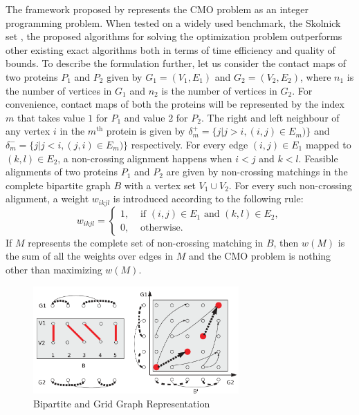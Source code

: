 The framework proposed by \citet{anmy11} represents the CMO problem as an integer programming problem.
When tested on a widely used benchmark, the Skolnick set \citep{gosk94}, the proposed algorithms for solving the optimization problem outperforms other existing exact algorithms both in terms of time efficiency and quality of bounds. To describe the formulation further, let us consider the contact maps of two proteins $P_1$ and $P_2$ given by $G_1 = (V_1,E_1)$ and $G_2 = (V_2,E_2)$, where $n_1$ is the number of vertices in $G_1$ and $n_2$ is the number of vertices in $G_2$. For convenience, contact maps of both the proteins will be represented by the index $m$ that takes value $1$ for $P_1$ and value $2$ for $P_2$. The right and left neighbour of any vertex $i$ in the $m^{\text{th}}$ protein is given by $\delta_m^+ = \{j | j>i ,(i,j) \in E_m)\}$ and  $\delta_m^- = \{j | j<i ,(j,i) \in E_m)\}$ respectively. For every edge $(i,j)\in E_1$ mapped to  $(k,l)\in E_2$, a non-crossing alignment happens when $i<j$ and $k<l$. Feasible alignments of two proteins $P_1$ and $P_2$ are given by non-crossing matchings in the complete bipartite graph $B$ with a vertex set $V_1\cup V_2$.
For every such non-crossing alignment, a weight $w_{ikjl}$ is introduced according to the following rule:
\begin{equation}
\label{rec11}
w_{ikjl}=\begin{cases}
    1, & \text{ if } (i,j) \in E_1 \text{ and } (k,l) \in E_2,\\
    0, & \text{ otherwise}.
  \end{cases}
\end{equation}
If $M$ represents the complete set of non-crossing matching in $B$, then $w(M)$ is the sum of all the weights over edges in $M$ and the CMO problem is nothing other than maximizing $w(M)$.

\begin{figure}[ht]
\centering
 \includegraphics[width=0.7\textwidth]{pic1}
 \caption{Bipartite and Grid Graph Representation}
 \label{fig:Bipartite and Grid Graph Representation}
\end{figure}

